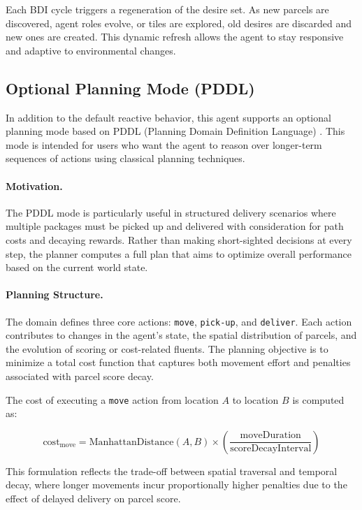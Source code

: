 Each BDI cycle triggers a regeneration of the desire set. As new parcels are discovered, agent roles evolve, or tiles are explored, old desires are discarded and new ones are created. This dynamic refresh allows the agent to stay responsive and adaptive to environmental changes.

\subsection{Optional Planning Mode (PDDL)}

In addition to the default reactive behavior, this agent supports an optional planning mode based on PDDL (Planning Domain Definition Language) \cite{mcdermott1998pddl}. This mode is intended for users who want the agent to reason over longer-term sequences of actions using classical planning techniques.

\paragraph{Motivation.}
The PDDL mode is particularly useful in structured delivery scenarios where multiple packages must be picked up and delivered with consideration for path costs and decaying rewards. Rather than making short-sighted decisions at every step, the planner computes a full plan that aims to optimize overall performance based on the current world state.

\paragraph{Planning Structure.}
The domain defines three core actions: \texttt{move}, \texttt{pick-up}, and \texttt{deliver}. Each action contributes to changes in the agent's state, the spatial distribution of parcels, and the evolution of scoring or cost-related fluents. The planning objective is to minimize a total cost function that captures both movement effort and penalties associated with parcel score decay.

The cost of executing a \texttt{move} action from location \( A \) to location \( B \) is computed as:

\[
\text{cost}_{\text{move}} = \text{ManhattanDistance}(A, B) \times \left( \frac{\text{moveDuration}}{\text{scoreDecayInterval}} \right)
\]

This formulation reflects the trade-off between spatial traversal and temporal decay, where longer movements incur proportionally higher penalties due to the effect of delayed delivery on parcel score.




